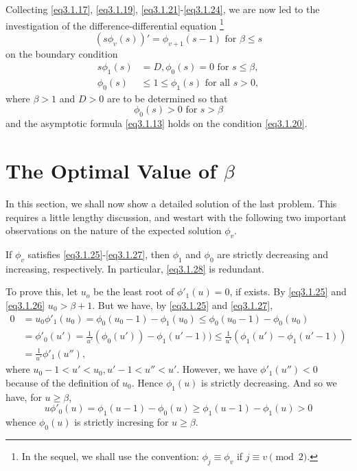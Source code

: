 Collecting \eqref{eq3.1.17}, \eqref{eq3.1.19},
\eqref{eq3.1.21}-\eqref{eq3.1.24}, we are now led to the 
investigation of the difference-differential equation \footnote{In the
  sequel, we shall use the convention: $\phi_j \equiv \phi_v$ if 
  $j \equiv v \pmod{2}$.}  
\begin{equation*}
  (s \phi_v (s))'= \phi_{v+1}(s-1) \text{ for } \beta \le s
  \tag{3.1.25}\label{eq3.1.25} 
\end{equation*}
on the boundary condition
\begin{align*}
  s \phi_1(s)& =D, \phi _0 (s)=0 \text{ for } s \le \beta,
  \tag{3.1.26}\label{eq3.1.26}\\ 
  \phi_0(s) &\le 1 \le \phi_1 (s) \text{ for all } s >0,
  \tag{3.1.27}\label{eq3.1.27} 
\end{align*}
where $\beta > 1$ and $D >0$ are to be determined so that
\begin{equation*}
\phi_0 (s)>0 \text{ for } s > \beta \tag{3.1.28}\label{eq3.1.28}
\end{equation*}
and the asymptotic formula \eqref{eq3.1.13} holds on the condition
\eqref{eq3.1.20}. 

\section{The Optimal Value of $\beta$}\label{chap3-sec3.2}%

In this section, we shall now show a detailed solution of the last
problem. This requires a little lengthy discussion, and 
we\pageoriginale start with the following two important observations
on the nature of the expected solution $\phi_v$. 
\begin{Lemma}\label{chap3-lem12} %
  If $\phi_v$ satisfies \eqref{eq3.1.25}-\eqref{eq3.1.27}, then
  $\phi_1$ and $\phi_0$ 
  are strictly decreasing and increasing, respectively. In particular,
  \eqref{eq3.1.28} is redundant. 
\end{Lemma}

To prove this, let $u_o$ be the least root of $\phi '_1 (u)=0$, if
exists. By \eqref{eq3.1.25} and \eqref{eq3.1.26} $u_0 > \beta +1$. But
we have, by 
\eqref{eq3.1.25} and \eqref{eq3.1.27}, 
\begin{align*}
  0&= u_0 \phi '_1 (u_0)=\phi _0 (u_0-1)- \phi_1 (u_0) \le \phi_0
  (u_0-1)-\phi_0 (u_0)\\ 
  &= \phi '_0(u')= \frac{1}{u'} (\phi _0(u'))- \phi_1 (u'-1 ))\le
  \frac {1}{u'}(\phi _1 (u')- \phi_1 (u'-1))\\ 
  &= \frac{1}{u'}\phi '_1(u''),
\end{align*}
where $u_0-1<u' < u_0,u'-1< u'' < u'$. However, we have $\phi '_1
(u'')<0$ because of the definition of $u_0$. Hence $\phi_1(u)$ is
strictly decreasing. And so we have, for $u \ge \beta$, 
$$
u \phi '_0 (u)= \phi_1 (u-1)- \phi_0 (u) \ge \phi_1 (u-1)- \phi_1 (u)> 0
$$
whence $\phi _0(u)$ is strictly incresing for $u \ge \beta$.

